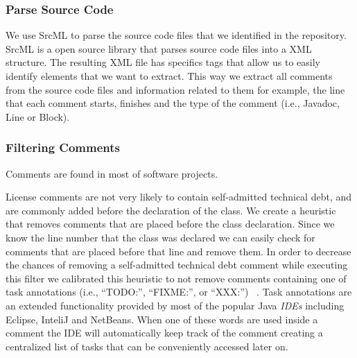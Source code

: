 
\subsubsection*{Parse Source Code}
\label{subsub:parse_source_code}

We use SrcML \cite{srcml} to parse the source code files that we identified in the repository. SrcML is a open source library that parses source code files into a XML structure. The resulting XML file has specifics tags that allow us to easily identify elements that we want to extract. This way we extract all comments from the source code files and information related to them for example, the line that each comment starts, finishes and the type of the comment (i.e., Javadoc, Line or Block).

\subsubsection*{Filtering Comments}
\label{subsub:filtering_comments}

Comments are found in most of software projects.

License comments are not very likely to contain self-admitted technical debt, and are commonly added before the declaration of the class. We create a heuristic that removes comments that are placed before the class declaration. Since we know the line number that the class was declared we can easily check for comments that are placed before that line and remove them. In order to decrease the chances of removing a self-admitted technical debt comment while executing this filter we calibrated this heuristic to not remove comments containing one of task annotations (i.e., ``TODO:'', ``FIXME:'', or ``XXX:'') ~\cite{Storey2008ICSE}. Task annotations are an extended functionality provided by most of the popular Java \textit{IDEs} including Eclipse, InteliJ and NetBeans. When one of these words are used inside a comment the IDE will automatically keep track of the comment creating a centralized list of tasks that can be conveniently accessed later on.


